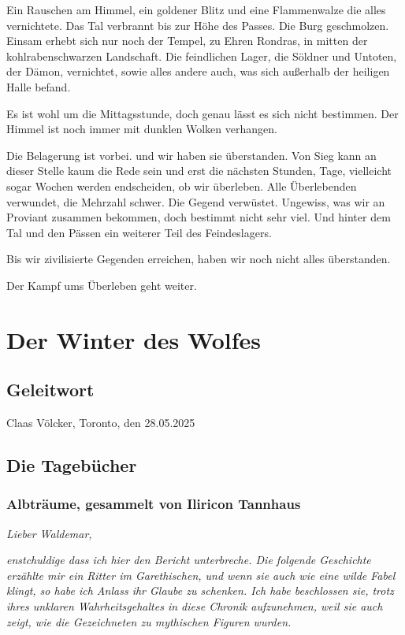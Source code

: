 Ein Rauschen am Himmel, ein goldener Blitz und eine Flammenwalze die alles vernichtete. Das Tal verbrannt bis zur Höhe des Passes. Die Burg geschmolzen. Einsam erhebt sich nur noch der Tempel, zu Ehren Rondras, in mitten der kohlrabenschwarzen Landschaft. Die feindlichen Lager, die Söldner und Untoten, der Dämon, vernichtet, sowie alles andere auch, was sich außerhalb der heiligen Halle befand.

Es ist wohl um die Mittagsstunde, doch genau lässt es sich nicht bestimmen. Der Himmel ist noch immer mit dunklen Wolken verhangen.

Die Belagerung ist vorbei. und wir haben sie überstanden. Von Sieg kann an dieser Stelle kaum die Rede sein und erst die nächsten Stunden, Tage, vielleicht sogar Wochen werden endscheiden, ob wir überleben. Alle Überlebenden verwundet, die Mehrzahl schwer. Die Gegend verwüstet. Ungewiss, was wir an Proviant zusammen bekommen, doch bestimmt nicht sehr viel. Und hinter dem Tal und den Pässen ein weiterer Teil des Feindeslagers.

Bis wir zivilisierte Gegenden erreichen, haben wir noch nicht alles überstanden.

Der Kampf ums Überleben geht weiter.

\chapter{Der Winter des Wolfes}

\section{Geleitwort}


\begin{flushright}
Claas Völcker, Toronto, den 28.05.2025
\end{flushright}


\section{Die Tagebücher}

\subsection{Albträume, gesammelt von Iliricon Tannhaus}

\emph{
    Lieber Waldemar,}

\emph{
    enstchuldige dass ich hier den Bericht unterbreche. Die folgende Geschichte erzählte mir ein Ritter im Garethischen, und wenn sie auch wie eine wilde Fabel klingt, so habe ich Anlass ihr Glaube zu schenken. Ich habe beschlossen sie, trotz ihres unklaren Wahrheitsgehaltes in diese Chronik aufzunehmen, weil sie auch zeigt, wie die Gezeichneten zu mythischen Figuren wurden.
}

